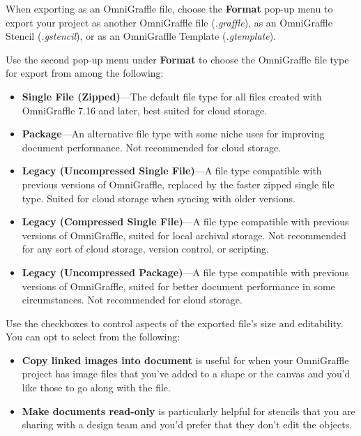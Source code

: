 \documentclass[../main.tex]{subfiles}
\begin{document}
When exporting as an OmniGraffle file, choose the \textbf{Format} pop-up menu to export your
project as another OmniGraffle file (\textit{.graffle}), as an OmniGraffle Stencil
(\textit{.gstencil}), or as an OmniGraffle Template (\textit{.gtemplate}).


Use the second pop-up menu under \textbf{Format} to choose the OmniGraffle file type for export
from among the following:

\begin{itemize}
  \item \textbf{Single File (Zipped)}---The default file type for all files created with
    OmniGraffle 7.16 and later, best suited for cloud storage.
  \item \textbf{Package}---An alternative file type with some niche uses for improving document
    performance. Not recommended for cloud storage.
  \item \textbf{Legacy (Uncompressed Single File)}---A file type compatible with previous
    versions of OmniGraffle, replaced by the faster zipped single file type. Suited for cloud
    storage when syncing with older versions.
  \item \textbf{Legacy (Compressed Single File)}---A file type compatible with previous versions
    of OmniGraffle, suited for local archival storage. Not recommended for any sort of cloud
    storage, version control, or scripting.
  \item \textbf{Legacy (Uncompressed Package)}---A file type compatible with previous versions
    of OmniGraffle, suited for better document performance in some circumstances. Not
    recommended for cloud storage.
\end{itemize}

Use the checkboxes to control aspects of the exported file's size and editability. You can opt
to select from the following:

\begin{itemize}
  \item \textbf{Copy linked images into document} is useful for when your OmniGraffle project
    has image files that you've added to a shape or the canvas and you'd like those to go along
    with the file.
  \item \textbf{Make documents read-only} is particularly helpful for stencils that you are
    sharing with a design team and you'd prefer that they don't edit the objects.
\end{itemize}
\end{document}
